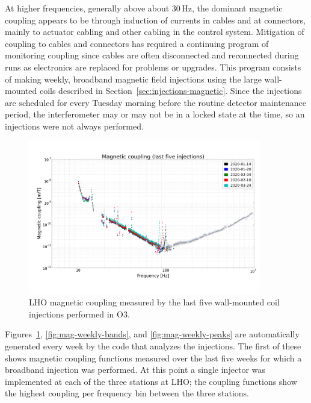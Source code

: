 At higher frequencies, generally above about 30\,Hz, the dominant magnetic coupling appears to be through induction of currents in cables and at connectors, mainly to actuator cabling and other cabling in the control system.
Mitigation of coupling to cables and connectors has required a continuing program of monitoring coupling since cables are often disconnected and reconnected during runs as electronics are replaced for problems or upgrades.
This program consists of making weekly, broadband magnetic field injections using the large wall-mounted coils described in Section~\ref{sec:injections-magnetic}.
Since the injections are scheduled for every Tuesday morning before the routine detector maintenance period, the interferometer may or may not be in a locked state at the time, so an injections were not always performed.

\begin{figure}
	\centering
	\includegraphics[width=0.9\textwidth]{figures/noise-studies/mag-weekly-cf.png}
	\caption{
		LHO magnetic coupling measured by the last five wall-mounted coil injections performed in O3.}
	\label{fig:mag-weekly-cf}
\end{figure}

Figures~\ref{fig:mag-weekly-cf}, \ref{fig:mag-weekly-bands}, and \ref{fig:mag-weekly-peaks} are automatically generated every week by the code that analyzes the injections.
The first of these shows magnetic coupling functions measured over the last five weeks for which a broadband injection was performed.
At this point a single injector was implemented at each of the three stations at LHO; the coupling functions show the highest coupling per frequency bin between the three stations.

